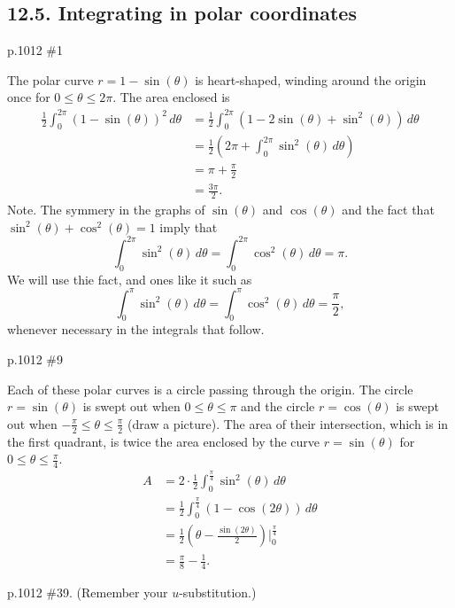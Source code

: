 \subsection{12.5. Integrating in polar coordinates}
\begin{practice}p.1012 \#1\end{practice}
\begin{pracsol}
  The polar curve $r=1-\sin(\theta)$ is heart-shaped, winding around the origin once for $0\leq \theta\leq 2\pi$. The area enclosed is
  \[\begin{split}
    \frac12\int_0^{2\pi}(1-\sin(\theta))^2\,d\theta &= \frac12\int_0^{2\pi}(1-2\sin(\theta)+\sin^2(\theta))\,d\theta\\
    &= \frac12\left(2\pi+\int_0^{2\pi}\sin^2(\theta)\,d\theta\right)\\
    &= \pi+\frac{\pi}{2}\\
    &= \frac{3\pi}{2}.
  \end{split} \]
  Note. The symmery in the graphs of $\sin(\theta)$ and $\cos(\theta)$ and the fact that $\sin^2(\theta)+\cos^2(\theta)=1$ imply that
  \[\int_0^{2\pi}\sin^2(\theta)\,d\theta=\int_0^{2\pi}\cos^2(\theta)\,d\theta=\pi.\]
  We will use thie fact, and ones like it such as
  \[\int_0^\pi\sin^2(\theta)\,d\theta =\int_0^\pi\cos^2(\theta)\,d\theta=\frac{\pi}2,\]
  whenever necessary in the integrals that follow.
\end{pracsol}
\begin{practice}p.1012 \#9\end{practice}
\begin{pracsol}
  Each of these polar curves is a circle passing through the origin. The circle $r=\sin(\theta)$ is swept out when $0\leq\theta\leq\pi$ and the circle $r=\cos(\theta)$ is swept out when $-\frac{\pi}{2}\leq\theta\leq\frac{\pi}{2}$ (draw a picture). The area of their intersection, which is in the first quadrant, is twice the area enclosed by the curve $r=\sin(\theta)$ for $0\leq\theta\leq\frac{\pi}4$.
  \[\begin{split}
    A &= 2\cdot\frac12\int_0^{\frac{\pi}4}\sin^2(\theta)\,d\theta \\
    &= \frac12\int_0^{\frac{\pi}4}(1-\cos(2\theta))\,d\theta\\
    &= \frac12\left(\theta-\frac{\sin(2\theta)}2\right)\Big|_0^{\frac{\pi}4}\\
    &= \frac{\pi}8-\frac14.
  \end{split}\]
\end{pracsol}
\begin{practice}p.1012 \#39. (Remember your $u$-substitution.)\end{practice}
